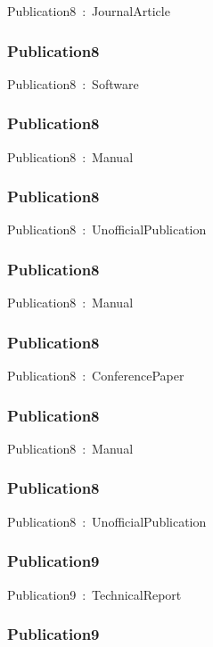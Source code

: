 \documentclass{article}
\begin{document}
Publication8~:~JournalArticle

\subsubsection*{Publication8}

Publication8~:~Software

\subsubsection*{Publication8}

Publication8~:~Manual

\subsubsection*{Publication8}

Publication8~:~UnofficialPublication

\subsubsection*{Publication8}

Publication8~:~Manual

\subsubsection*{Publication8}

Publication8~:~ConferencePaper

\subsubsection*{Publication8}

Publication8~:~Manual

\subsubsection*{Publication8}

Publication8~:~UnofficialPublication

\subsubsection*{Publication9}

Publication9~:~TechnicalReport

\subsubsection*{Publication9}
\end{document}
